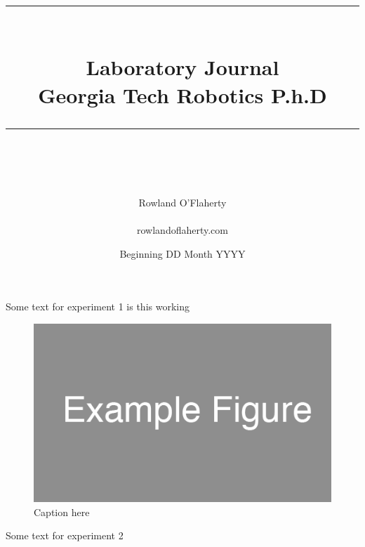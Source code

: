 \documentclass[idxtotoc,hyperref,openany,oneside]{ROLatex/labbook} %
\newcommand{\HRule}{\rule{\linewidth}{0.5mm}} %
\begin{document}

\frontmatter %
\title{
\begin{center}
\HRule \\[0.4cm]
{\Huge \bfseries Laboratory Journal \\[0.5cm] \Large Georgia Tech Robotics P.h.D}\\[0.4cm] %
\HRule \\[1.5cm]
\end{center}
}
\author{\Huge Rowland O'Flaherty \\ \\ \LARGE rowlandoflaherty.com \\[2cm]}
\date{Beginning DD Month YYYY} %
\maketitle

\tableofcontents

\mainmatter %





Some text for experiment 1 is this working

\begin{figure}[H]
  \centering
  \includegraphics[]{Figs_2000_12_30/example_figure.png}
  \caption{Caption here}
  \label{fig:1}
\end{figure}



Some text for experiment 2


\end{document}
